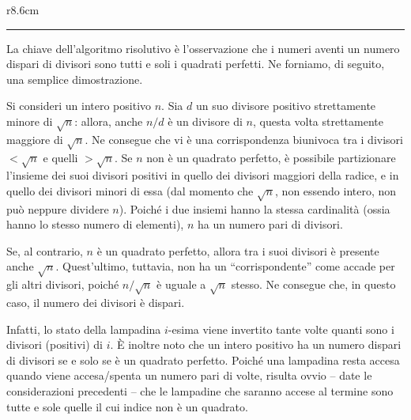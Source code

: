 \begin{wrapfigure}{r}{8.6cm}
\vspace*{-.1cm}
    \begin{minipage}{8.5cm}
    	\begin{mdframed}[style=tight]
    		\begingroup
    		\setlength{\fboxsep}{0pt}%
    		\colorbox{black!50!white}{}
    		\endgroup
    		\hrule\vspace*{2mm}
    		\hspace{.03\linewidth}\begin{minipage}{.94\linewidth}
    La chiave dell'algoritmo risolutivo è l'osservazione che i numeri aventi un numero dispari di divisori sono tutti e soli i quadrati perfetti. Ne forniamo, di seguito, una semplice dimostrazione.
    
    Si consideri un intero positivo $n$. Sia $d$ un suo divisore positivo strettamente minore di $\sqrt n$: allora, anche $n/d$ è un divisore di $n$, questa volta strettamente maggiore di $\sqrt n$. Ne consegue che vi è una corrispondenza biunivoca tra i divisori $< \sqrt n$ e quelli $> \sqrt n$. Se $n$ non è un quadrato perfetto, è possibile partizionare l'insieme dei suoi divisori positivi in quello dei divisori maggiori della radice, e in quello dei divisori minori di essa (dal momento che $\sqrt n$, non essendo intero, non può neppure dividere $n$). Poiché i due insiemi hanno la stessa cardinalità (ossia hanno lo stesso numero di elementi), $n$ ha un numero pari di divisori.
    
    Se, al contrario, $n$ è un quadrato perfetto, allora tra i suoi divisori è presente anche $\sqrt n$. Quest'ultimo, tuttavia, non ha un ``corrispondente'' come accade per gli altri divisori, poiché $n / \sqrt n$ è uguale a $\sqrt n$ stesso. Ne consegue che, in questo caso, il numero dei divisori è dispari.
    
    
    		\end{minipage}
    	\end{mdframed}
    \end{minipage}
\end{wrapfigure}
    
    Infatti, lo stato della lampadina $i$-esima viene invertito tante volte quanti sono i divisori (positivi) di $i$. È inoltre noto che un intero positivo ha un numero dispari di divisori se e solo se è un quadrato perfetto. Poiché una lampadina resta accesa quando viene accesa/spenta un numero pari di volte, risulta ovvio -- date le considerazioni precedenti -- che le lampadine che saranno accese al termine sono tutte e sole quelle il cui indice non è un quadrato.
    
